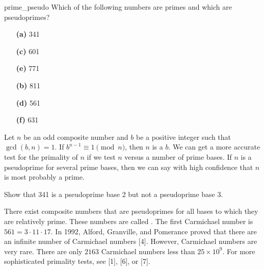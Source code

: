 \begin{exercise}{prime_pseudo}
Which of the following numbers are primes  and which are pseudoprimes?
  
\vspace{3pt}        %
 
\hspace{-7pt}
\begin{minipage}[t]{4.6in}
\noindent
\begin{minipage}[t]{2.25in}
\begin{itemize}
 
 \item[{\bf (a)}]
341
 
 \item[{\bf (c)}]
601
 
 \item[{\bf (e)}]
771
 
\end{itemize}
\end{minipage} \hfill
\begin{minipage}[t]{2.25in}
\begin{itemize}
 
 \item[{\bf (b)}]
811
 
 \item[{\bf (d)}]
561
 
 \item[{\bf (f)}]
631
 
\end{itemize}
\end{minipage}
\end{minipage}
 
\vspace{2pt}        %
\end{exercise} 
 
Let $n$ be an odd composite number and $b$ be a positive integer such
that $\gcd(b, n) = 1$. If $b^{n-1} \equiv 1 \pmod{n}$, then $n$ is a
 $b$. We can get a more accurate test for the  primality of $n$  if we 
test $n$ versus a number of prime bases. If $n$ is a pseudoprime for several prime bases, then we can say with high confidence that $n$ is most probably a prime.


\begin{exercise}{}
Show that 341 is a pseudoprime base 2 but
not a pseudoprime base 3.
\end{exercise}  

There exist composite numbers that are pseudoprimes for all bases to
which they are relatively prime.  These numbers are called . The first Carmichael
number is $561 = 3 \cdot 11 \cdot 17$.  In 1992, Alford, Granville, and
Pomerance proved that there are an infinite number of Carmichael
numbers [4].  However, Carmichael numbers are very rare.  There are
only $2163$ Carmichael numbers less than $25 \times 10^9$. For more
sophisticated primality tests, see [1], [6], or [7].  
 
